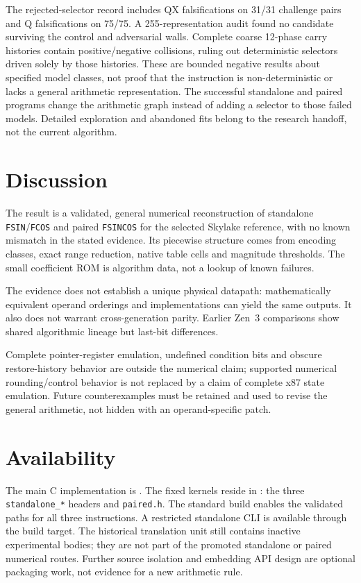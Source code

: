 \documentclass[11pt]{article}
\newcommand{\instr}[1]{\texttt{#1}}
\begin{document}
The rejected-selector record includes QX falsifications on 31/31 challenge
pairs and Q falsifications on 75/75. A 255-representation audit found no
candidate surviving the control and adversarial walls. Complete coarse
12-phase carry histories contain positive/negative collisions, ruling out
deterministic selectors driven solely by those histories. These are bounded
negative results about specified model classes, not proof that the instruction
is non-deterministic or lacks a general arithmetic representation.
The successful standalone and paired programs change the arithmetic graph instead of
adding a selector to those failed models. Detailed exploration and abandoned
fits belong to the research handoff, not the current algorithm.

\section{Discussion}
\label{sec:discussion}

The result is a validated, general numerical reconstruction of standalone
\instr{FSIN}/\instr{FCOS} and paired \instr{FSINCOS} for the selected Skylake
reference, with no known
mismatch in the stated evidence. Its piecewise structure comes from encoding
classes, exact range reduction, native table cells and magnitude thresholds.
The small coefficient ROM is algorithm data, not a lookup of known failures.

The evidence does not establish a unique physical datapath: mathematically
equivalent operand orderings and implementations can yield the same outputs.
It also does not warrant cross-generation parity. Earlier Zen~3 comparisons
show shared algorithmic lineage but last-bit differences.

Complete pointer-register emulation, undefined condition bits and obscure
restore-history behavior are outside the numerical claim; supported numerical
rounding/control behavior is not replaced by a claim of complete x87 state
emulation. Future counterexamples must be retained and used to revise the
general arithmetic, not hidden with an operand-specific patch.

\section{Availability}

The main C implementation is .
The fixed kernels reside in : the three
\texttt{standalone\_*} headers and \texttt{paired.h}.
The standard build enables the validated paths for all three instructions.
A restricted standalone CLI is available through the
 build target. The historical translation unit still
contains inactive experimental bodies; they are not part of the promoted
standalone or paired numerical routes. Further source isolation and embedding
API design are optional packaging work, not evidence for a new arithmetic rule.
\end{document}

